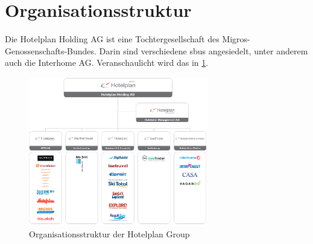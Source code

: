 \section{Organisationsstruktur}
\label{sec:einleitung:ausgangslage:organisationsstruktur}
Die Hotelplan Holding AG ist eine Tochtergesellschaft des Migros-Genossenschafts-Bundes. Darin sind verschiedene \glspl{sbu} angesiedelt, unter anderem auch die Interhome AG. Veranschaulicht wird das in \cref{fig:einleitung:organisationsstruktur:1}.
\label{sec:einleitung:organisationsstruktur}
\begin{figure}[h]
	\RawFloats
	\centering
	\includegraphics[width=0.7\textwidth]{images/organisationsstruktur}
	\caption{Organisationsstruktur der Hotelplan Group}
	\label{fig:einleitung:organisationsstruktur:1}
\end{figure}

